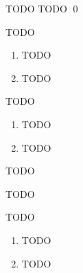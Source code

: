 \documentclass{article}
\begin{document}
\newpage
{} TODO
\hop
\solution
TODO \qed


\newpage
{} TODO
\hop
\solution
\begin{enumerate}
    \item TODO
    \item TODO
\end{enumerate}


\newpage
{} TODO
\hop
\solution
\begin{enumerate}
    \item TODO
    \item TODO
\end{enumerate}


\newpage
{} TODO
\hop
\solution

TODO 


\newpage
{} TODO
\hop
\solution
\begin{enumerate}
    \item TODO
    \item TODO
\end{enumerate}
\end{document}
